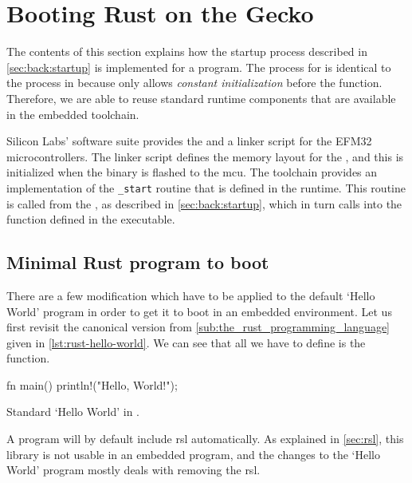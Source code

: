 \section{Booting Rust on the Gecko}
\label{sec:impl:booting}

The contents of this section explains how the startup process described in \autoref{sec:back:startup} is implemented for a {\rust} program.
The process for {\rust} is identical to the process in {\C} because {\rust} only allows \emph{constant initialization} before the {\main} function.
Therefore, we are able to reuse standard runtime components that are available in the {\C} embedded toolchain.

Silicon Labs' software suite provides the  and a linker script for the EFM32 microcontrollers.
The linker script defines the memory layout for the {\gecko}, and this is initialized when the  binary is flashed to the \gls{mcu}.
The {\armgcc} toolchain provides an implementation of the \texttt{\_start} routine that is defined in the {\C} runtime.
This routine is called from the {}, as described in \autoref{sec:back:startup}, which in turn calls into the  function defined in the {\rust} executable.

\subsection{Minimal Rust program to boot}
\label{ssec:minimal_rust_program_to_boot}

There are a few modification which have to be applied to the default `Hello World' program in order to get it to boot in an embedded environment.
Let us first revisit the canonical version from \autoref{sub:the_rust_programming_language} given in \autoref{lst:rust-hello-world}.
We can see that all we have to define is the  function.

\begin{listing}[H]
  \begin{rustcode}
fn main() {
  println!("Hello, World!");
}
  \end{rustcode}
  \caption{Standard `Hello World' in {\rust}.}
  \label{lst:rust-hello-world}
\end{listing}

A {\rust} program will by default include \glsdesc{rsl} automatically.
As explained in \autoref{sec:rsl}, this library is not usable in an embedded program, and the changes to the `Hello World' program mostly deals with removing the \gls{rsl}.

